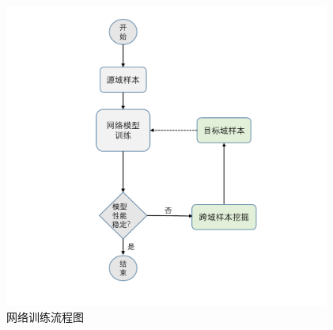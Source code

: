 \begin{figure}[h]
  \centering
  \includegraphics[height=10cm]{Img/crossdomain.pdf}
  \caption{网络训练流程图}
  \label{fig:crossdomain}
\end{figure}

